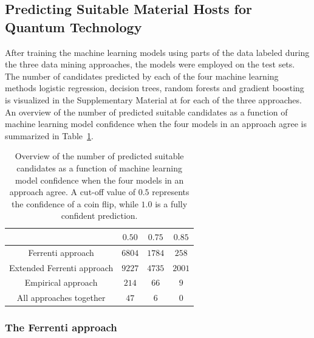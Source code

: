 \documentclass[superscriptaddress,unsortedaddress,
 amsmath,amssymb,
 aps,
]{revtex4-2}
\begin{document}
\subsection*{Predicting Suitable Material Hosts for Quantum Technology} 
After training the machine learning models using parts of the data labeled during the three data mining approaches, the models were employed on the test sets. 
The number of candidates predicted by each of the four machine learning methods logistic regression, decision trees, random forests and gradient boosting is visualized in the Supplementary Material at \cite{supplementary} for each of the three approaches. 
An overview of the number of predicted suitable candidates as a function of machine learning model confidence when the four models in an approach agree is summarized in Table~\ref{tab:probabilites}. 

\begin{table}[t]
    \centering 
    \caption{Overview of the number of predicted suitable candidates as a function of machine learning model confidence when the four models in an approach agree. A cut-off value of $0.5$ represents the confidence of a coin flip, while $1.0$ is a fully confident prediction.}
    \begin{tabular}{c|c|c|c}
      & $0.50$ & $0.75$ & $0.85$ \\
     \hline
     Ferrenti approach &  $6804$ & $1784$ & $258$  \\
     Extended Ferrenti approach &  $9227$ & $4735$  & $2001$  \\ 
     Empirical approach & $214$ & $66$ & $9$ \\
     \hline
     All approaches together & $47$ & $6$ & 0 \\
    \end{tabular}
    \label{tab:probabilites}
\end{table} 

\subsubsection*{The Ferrenti approach}
\end{document}
